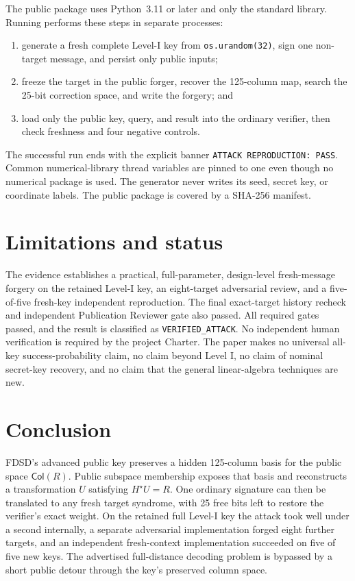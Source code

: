 \documentclass[10pt,a4paper]{article}
\newcommand{\Col}{\mathsf{Col}}
\begin{document}
The public package uses Python~3.11 or later and only the standard library.
Running  performs these steps in separate
processes:
\begin{enumerate}
  \item generate a fresh complete Level-I key from \texttt{os.urandom(32)},
        sign one non-target message, and persist only public inputs;
  \item freeze the target in the public forger, recover the 125-column map,
        search the 25-bit correction space, and write the forgery; and
  \item load only the public key, query, and result into the ordinary verifier,
        then check freshness and four negative controls.
\end{enumerate}
The successful run ends with the explicit banner
\texttt{ATTACK REPRODUCTION: PASS}. Common numerical-library thread variables
are pinned to one even though no numerical package is used. The generator
never writes its seed, secret key, or coordinate labels. The public package is
covered by a SHA-256 manifest.

\section{Limitations and status}

The evidence establishes a practical, full-parameter, design-level
fresh-message forgery on the retained Level-I key, an eight-target adversarial
review, and a five-of-five fresh-key independent reproduction. The final
exact-target history recheck and independent Publication Reviewer gate also
passed. All required gates passed, and the result is classified as
\texttt{VERIFIED\_ATTACK}.
No independent human verification is required by the project Charter. The
paper makes no universal all-key success-probability claim, no claim beyond
Level I, no claim of nominal secret-key recovery, and no claim that the
general linear-algebra techniques are new.

\section{Conclusion}

FDSD's advanced public key preserves a hidden 125-column basis for the public
space $\Col(R)$. Public subspace membership exposes that basis and reconstructs
a transformation $U$ satisfying $H^\star U=R$. One ordinary signature can then
be translated to any fresh target syndrome, with 25 free bits left to restore
the verifier's exact weight. On the retained full Level-I key the attack took
well under a second internally, a separate adversarial implementation forged
eight further targets, and an independent fresh-context implementation
succeeded on five of five new keys. The advertised full-distance decoding
problem is bypassed by a short public detour through the key's preserved
column space.
\end{document}
